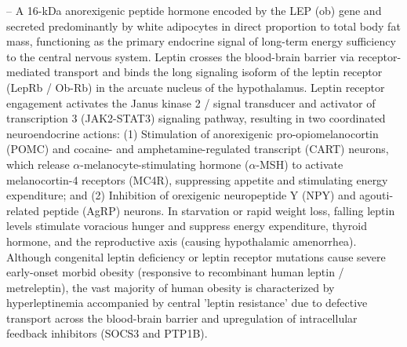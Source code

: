 -- A 16-kDa anorexigenic peptide hormone encoded by the LEP (ob) gene and secreted predominantly by white adipocytes in direct proportion to total body fat mass, functioning as the primary endocrine signal of long-term energy sufficiency to the central nervous system. Leptin crosses the blood-brain barrier via receptor-mediated transport and binds the long signaling isoform of the leptin receptor (LepRb / Ob-Rb) in the arcuate nucleus of the hypothalamus. Leptin receptor engagement activates the Janus kinase 2 / signal transducer and activator of transcription 3 (JAK2-STAT3) signaling pathway, resulting in two coordinated neuroendocrine actions: (1) Stimulation of anorexigenic pro-opiomelanocortin (POMC) and cocaine- and amphetamine-regulated transcript (CART) neurons, which release $\alpha$-melanocyte-stimulating hormone ($\alpha$-MSH) to activate melanocortin-4 receptors (MC4R), suppressing appetite and stimulating energy expenditure; and (2) Inhibition of orexigenic neuropeptide Y (NPY) and agouti-related peptide (AgRP) neurons. In starvation or rapid weight loss, falling leptin levels stimulate voracious hunger and suppress energy expenditure, thyroid hormone, and the reproductive axis (causing hypothalamic amenorrhea). Although congenital leptin deficiency or leptin receptor mutations cause severe early-onset morbid obesity (responsive to recombinant human leptin / metreleptin), the vast majority of human obesity is characterized by hyperleptinemia accompanied by central 'leptin resistance' due to defective transport across the blood-brain barrier and upregulation of intracellular feedback inhibitors (SOCS3 and PTP1B).

